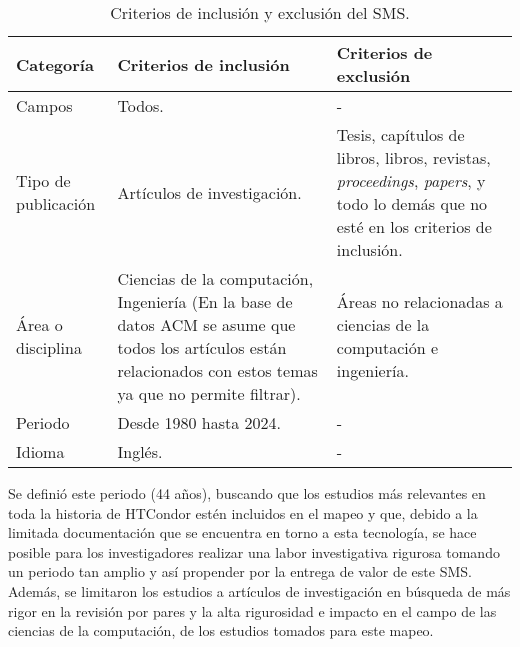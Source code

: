 \begin{table*}[htbp]
	
	\centering
	\renewcommand{\arraystretch}{1.7}  %
	\renewcommand{\tablename}{Tabla}  %
	\setlength{\tabcolsep}{3pt}      %
	\vspace{10pt}                     %
	\begin{tabularx}{\textwidth}{|>{\arraybackslash}m{2.3cm}|>{\arraybackslash}X|>{\arraybackslash}X|}
		\hline	
		\textbf{Categoría} & \textbf{Criterios de inclusión} & \textbf{Criterios de exclusión} \\
		\hline
		Campos &  Todos. & - \\
		\hline
		Tipo de publicación & Artículos de investigación. & Tesis, capítulos de libros, libros, revistas, \textit{proceedings}, \textit{papers}, y todo lo demás que no esté en los criterios de inclusión. \\
		\hline
		Área o disciplina & Ciencias de la computación, Ingeniería (En la base de datos ACM se asume que todos los artículos están relacionados con estos temas ya que no permite filtrar). & Áreas no relacionadas a ciencias de la computación e ingeniería. \\
		\hline
		Periodo & Desde 1980 hasta 2024. & - \\
		\hline
		Idioma & Inglés. & - \\
		\hline
	\end{tabularx}
	\vspace{6pt}  %
	\caption{Criterios de inclusión y exclusión del SMS.}
	\label{table:Criteria}
	
\end{table*}

Se definió este periodo (44 años), buscando que los estudios más relevantes en toda la historia de HTCondor estén incluidos en el mapeo y que, debido a la limitada documentación que se encuentra en torno a esta tecnología, se hace posible para los investigadores realizar una labor investigativa rigurosa tomando un periodo tan amplio y así propender por la entrega de valor de este SMS. Además, se limitaron los estudios a artículos de investigación en búsqueda de más rigor en la revisión por pares y la alta rigurosidad e impacto en el campo de las ciencias de la computación, de los estudios tomados para este mapeo.

